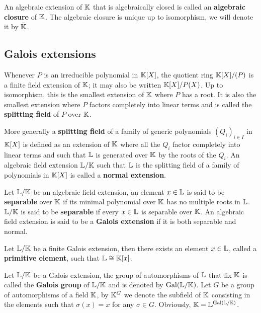 An algebraic extension of $\mathbb{K}$ that is algebraically closed is called
an 
\textbf{algebraic closure} of $\mathbb{K}$. The algebraic closure is unique up
to isomorphism, we will denote it by $\bar{\mathbb{K}}$.


\subsection{Galois extensions}
\label{sec:basic-galois-theory:galois-extensions}
Whenever $P$ is an irreducible polynomial in $\mathbb{K}[X]$, the quotient
ring $\mathbb{K}[X]/(P)$ is a finite field extension of $\mathbb{K}$; it may also be
written $\mathbb{K}[X]/P(X)$. Up to isomorphism, this is the smallest
extension of $\mathbb{K}$ where $P$ has a root. It is also the smallest
extension where $P$ factors completely into linear terms and is called
the \textbf{splitting field} of $P$ over
$\mathbb{K}$. 

More generally a \textbf{splitting field} of a family of generic
polynomials $(Q_i)_{i\in I}$ in $\mathbb{K}[X]$ is defined as an extension of
$\mathbb{K}$ where all the $Q_i$ factor completely into linear terms and such
that $\mathbb{L}$ is generated over $\mathbb{K}$ by the roots of the $Q_i$. An
algebraic field extension $\mathbb{L}/\mathbb{K}$ such that $\mathbb{L}$ is the splitting
field of a family of polynomials in $\mathbb{K}[X]$ is called a
  \textbf{normal
  extension}.

Let $\mathbb{L}/\mathbb{K}$ be an algebraic field extension, an element $x\in\mathbb{L}$ is
said to be  \textbf{separable} over $\mathbb{K}$ if
its minimal polynomial over $\mathbb{K}$ has no multiple roots in $\mathbb{L}$.
$\mathbb{L}/\mathbb{K}$ is said to be 
 \textbf{separable} if every $x\in\mathbb{L}$ is
separable over $\mathbb{K}$. An algebraic field extension is said to be a
  \textbf{Galois
  extension} if it is both separable and normal.

\begin{theorem}
  Let $\mathbb{L}/\mathbb{K}$ be a finite Galois extension, then there exists an
  element $x\in\mathbb{L}$, called a
  \textbf{primitive element}, such that
  $\mathbb{L}\cong\mathbb{K}[x]$.
\end{theorem}

Let $\mathbb{L}/\mathbb{K}$ be a Galois extension, the group of automorphisms of
$\mathbb{L}$ that fix $\mathbb{K}$ is called the \textbf{Galois
  group} of $\mathbb{L}/\mathbb{K}$ and is denoted by $\operatorname{Gal}(\mathbb{L}/\mathbb{K})$.  Let $G$ be a
group of automorphisms of a field $\mathbb{K}$, by $\mathbb{K}^G$ we denote the
subfield of $\mathbb{K}$ consisting in the elements such that $\sigma(x)=x$
for any $\sigma\in G$. Obviously, $\mathbb{K}=\mathbb{L}^{\operatorname{Gal}(\mathbb{L}/\mathbb{K})}$.

